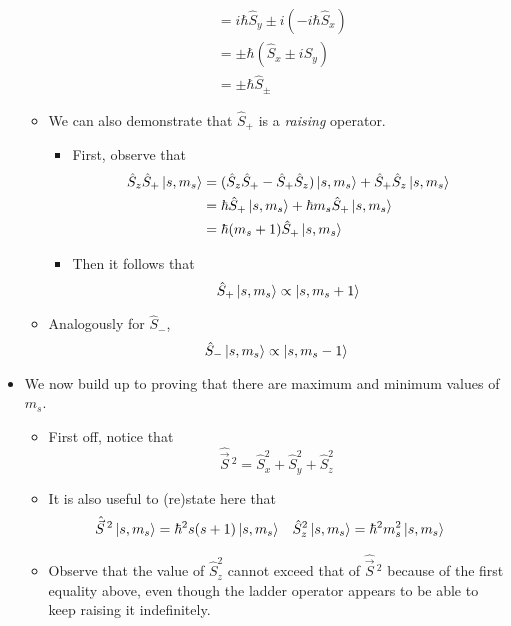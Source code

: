 \documentclass[../notes.tex]{subfiles}
\begin{document}
\begin{itemize}
\begin{itemize}
\begin{align*}
            &= i\hbar\hat{S}_y\pm i(-i\hbar\hat{S}_x)\\
            &= \pm\hbar(\hat{S}_x\pm i\hat{S}_y)\\
            &= \pm\hbar\hat{S}_\pm
        \end{align*}
        \item We can also demonstrate that $\hat{S}_+$ is a \emph{raising} operator.
        \begin{itemize}
            \item First, observe that
            \begin{align*}
                \hat{S}_z\hat{S}_+\ket{s,m_s} &= (\hat{S}_z\hat{S}_+-\hat{S}_+\hat{S}_z)\ket{s,m_s}+\hat{S}_+\hat{S}_z\ket{s,m_s}\\
                &= \hbar\hat{S}_+\ket{s,m_s}+\hbar m_s\hat{S}_+\ket{s,m_s}\\
                &= \hbar(m_s+1)\hat{S}_+\ket{s,m_s}
            \end{align*}
            \item Then it follows that
            \begin{equation*}
                \hat{S}_+\ket{s,m_s} \propto \ket{s,m_s+1}
            \end{equation*}
        \end{itemize}
        \item Analogously for $\hat{S}_-$,
        \begin{equation*}
            \hat{S}_-\ket{s,m_s} \propto \ket{s,m_s-1}
        \end{equation*}
    \end{itemize}
    \item We now build up to proving that there are maximum and minimum values of $m_s$.
    \begin{itemize}
        \item First off, notice that
        \begin{equation*}
            \hat{\vec{S}}{\,}^2 = \hat{S}_x^2+\hat{S}_y^2+\hat{S}_z^2
        \end{equation*}
        \item It is also useful to (re)state here that
        \begin{align*}
            \hat{\vec{S}}{\,}^2\ket{s,m_s} &= \hbar^2s(s+1)\ket{s,m_s}&
            \hat{S}_z^2\ket{s,m_s} &= \hbar^2m_s^2\ket{s,m_s}
        \end{align*}
        \item Observe that the value of $\hat{S}_z^2$ cannot exceed that of $\hat{\vec{S}}{\,}^2$ because of the first equality above, even though the ladder operator appears to be able to keep raising it indefinitely.

\end{itemize}
\end{itemize}
\end{document}
